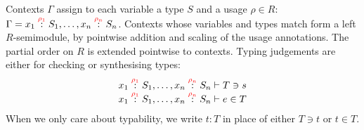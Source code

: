Contexts $\Gamma$ assign to each variable a type $S$ and a usage
$\rho \in R$:
$\Gamma = \ctxvar{x_1}{S_1}{\rho_1}, \ldots,
\ctxvar{x_n}{S_n}{\rho_n}$.
Contexts whose variables and types match form a left $R$-semimodule,
by pointwise addition and scaling of the usage annotations. The
partial order on $R$ is extended pointwise to contexts.
Typing judgements are either for checking or synthesising types:
\begin{displaymath}
  \begin{array}{l}
    \ctxvar{x_1}{S_1}{\rho_1}, \ldots, \ctxvar{x_n}{S_n}{\rho_n} \vdash T \ni s \\
    \ctxvar{x_1}{S_1}{\rho_1}, \ldots, \ctxvar{x_n}{S_n}{\rho_n} \vdash e \in T
  \end{array}
\end{displaymath}
When we only care about typability, we write $t : T$ in place of
either $T \ni t$ or $t \in T$.


